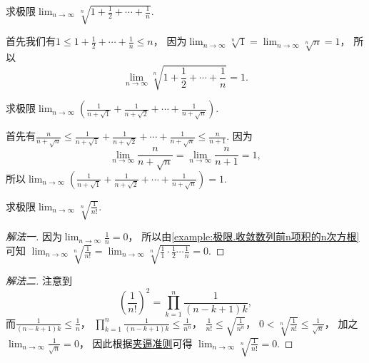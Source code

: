 \begin{example}
求极限\(\lim_{n\to\infty} \sqrt[n]{1+\frac12+\dotsb+\frac1n}\).
\begin{solution}
首先我们有\(1 \leq 1+\frac12+\dotsb+\frac1n \leq n\)，
因为\(\lim_{n\to\infty} \sqrt[n]{1} = \lim_{n\to\infty} \sqrt[n]{n} = 1\)，
所以\[
	\lim_{n\to\infty} \sqrt[n]{1+\frac12+\dotsb+\frac1n} = 1.
\]
\end{solution}
\end{example}

\begin{example}
求极限\(\lim_{n\to\infty} \left(\frac1{n+\sqrt1}+\frac1{n+\sqrt2}+\dotsb+\frac1{n+\sqrt{n}}\right)\).
\begin{solution}
首先有\(\frac{n}{n+\sqrt{n}}
\leq \frac1{n+\sqrt1}+\frac1{n+\sqrt2}+\dotsb+\frac1{n+\sqrt{n}}
\leq \frac{n}{n+1}\).
因为\[
	\lim_{n\to\infty} \frac{n}{n+\sqrt{n}}
	= \lim_{n\to\infty} \frac{n}{n+1} = 1,
\]
所以\(\lim_{n\to\infty} \left(\frac1{n+\sqrt1}+\frac1{n+\sqrt2}+\dotsb+\frac1{n+\sqrt{n}}\right) = 1\).
\end{solution}
\end{example}

\begin{example}
求极限\(\lim_{n\to\infty} \sqrt[n]{\frac1{n!}}\).
\begin{solution}\let\qed\relax
\begin{proof}[解法一]
因为\(\lim_{n\to\infty} \frac1n = 0\)，
所以由\cref{example:极限.收敛数列前n项积的n次方根} 可知
\(\lim_{n\to\infty} \sqrt[n]{\frac1{n!}}
= \lim_{n\to\infty} \sqrt[n]{\frac11 \cdot \frac12 \dotsm \frac1n}
= 0\).
\end{proof}
\begin{proof}[解法二]
注意到\[
	\left(\frac1{n!}\right)^2
	= \prod_{k=1}^n \frac1{(n-k+1)k},%
\]
而\(\frac1{(n-k+1)k} \leq \frac1n\)，
\(\prod_{k=1}^n \frac1{(n-k+1)k} \leq \frac1{n^n}\)，
\(\frac1{n!} \leq \sqrt{\frac1{n^n}}\)，
\(0 < \sqrt[n]{\frac1{n!}} \leq \frac1{\sqrt{n}}\)，
加之\(\lim_{n\to\infty} \frac1{\sqrt{n}} = 0\)，
因此根据\hyperref[theorem:极限.夹逼准则]{夹逼准则}可得
\(\lim_{n\to\infty} \sqrt[n]{\frac1{n!}} = 0\).
\end{proof}
\end{solution}
\end{example}

